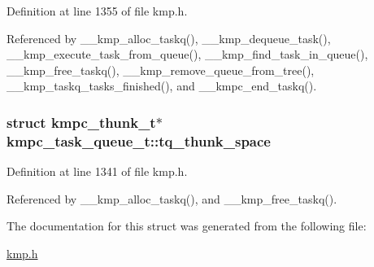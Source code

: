 Definition at line 1355 of file kmp.\-h.



Referenced by \-\_\-\-\_\-kmp\-\_\-alloc\-\_\-taskq(), \-\_\-\-\_\-kmp\-\_\-dequeue\-\_\-task(), \-\_\-\-\_\-kmp\-\_\-execute\-\_\-task\-\_\-from\-\_\-queue(), \-\_\-\-\_\-kmp\-\_\-find\-\_\-task\-\_\-in\-\_\-queue(), \-\_\-\-\_\-kmp\-\_\-free\-\_\-taskq(), \-\_\-\-\_\-kmp\-\_\-remove\-\_\-queue\-\_\-from\-\_\-tree(), \-\_\-\-\_\-kmp\-\_\-taskq\-\_\-tasks\-\_\-finished(), and \-\_\-\-\_\-kmpc\-\_\-end\-\_\-taskq().

\hypertarget{structkmpc__task__queue__t_a2ba2f7f3ea4c47df06f7220d66a9064e}{
\subsubsection[{tq\-\_\-thunk\-\_\-space}]{\setlength{\rightskip}{0pt plus 5cm}struct {\bf kmpc\-\_\-thunk\-\_\-t}$\ast$ kmpc\-\_\-task\-\_\-queue\-\_\-t\-::tq\-\_\-thunk\-\_\-space}}\label{structkmpc__task__queue__t_a2ba2f7f3ea4c47df06f7220d66a9064e}


Definition at line 1341 of file kmp.\-h.



Referenced by \-\_\-\-\_\-kmp\-\_\-alloc\-\_\-taskq(), and \-\_\-\-\_\-kmp\-\_\-free\-\_\-taskq().



The documentation for this struct was generated from the following file\-:\begin{DoxyCompactItemize}
\item 
\hyperlink{kmp_8h}{kmp.\-h}\end{DoxyCompactItemize}
